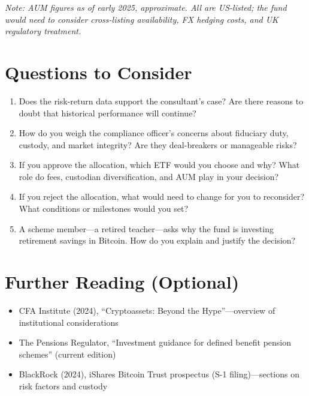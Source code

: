 \documentclass[11pt]{article}
\begin{document}
\smallskip
\noindent\textit{Note: AUM figures as of early 2025, approximate. All are US-listed; the fund would need to consider cross-listing availability, FX hedging costs, and UK regulatory treatment.}

\section*{Questions to Consider}

\begin{enumerate}[leftmargin=*]
\item Does the risk-return data support the consultant's case? Are there reasons to doubt that historical performance will continue?

\item How do you weigh the compliance officer's concerns about fiduciary duty, custody, and market integrity? Are they deal-breakers or manageable risks?

\item If you approve the allocation, which ETF would you choose and why? What role do fees, custodian diversification, and AUM play in your decision?

\item If you reject the allocation, what would need to change for you to reconsider? What conditions or milestones would you set?

\item A scheme member---a retired teacher---asks why the fund is investing retirement savings in Bitcoin. How do you explain and justify the decision?
\end{enumerate}

\section*{Further Reading (Optional)}

\begin{itemize}[leftmargin=*]
\item CFA Institute (2024), ``Cryptoassets: Beyond the Hype''---overview of institutional considerations
\item The Pensions Regulator, ``Investment guidance for defined benefit pension schemes'' (current edition)
\item BlackRock (2024), iShares Bitcoin Trust prospectus (S-1 filing)---sections on risk factors and custody
\end{itemize}

\newpage
\end{document}
